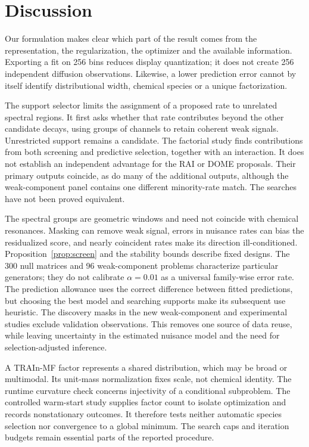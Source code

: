 \FloatBarrier
\section{Discussion}
Our formulation makes clear which part of the result comes from the representation,
the regularization, the optimizer and the available information. Exporting a fit
on 256 bins reduces display quantization; it does not create 256 independent
diffusion observations. Likewise, a lower prediction error cannot by itself
identify distributional width, chemical species or a unique factorization.

The support selector limits the assignment of a proposed rate to unrelated
spectral regions. It first asks whether that rate contributes beyond the other
candidate decays, using groups of channels to retain coherent weak signals.
Unrestricted support remains a candidate. The factorial study finds contributions
from both screening and predictive selection, together with an interaction.
It does not establish an independent advantage for the RAI or DOME proposals.
Their primary outputs coincide, as do many of the additional outputs, although
the weak-component panel contains one different minority-rate match. The searches
have not been proved equivalent.

The spectral groups are geometric windows and need not coincide with chemical
resonances. Masking can remove weak signal, errors in nuisance rates can bias the
residualized score, and nearly coincident rates make its direction ill-conditioned.
Proposition~\ref{prop:screen} and the stability bounds describe fixed designs.
The 300 null matrices and 96 weak-component problems characterize particular
generators; they do not calibrate $\alpha=0.01$ as a universal family-wise error
rate. The prediction allowance uses the correct difference between fitted
predictions, but choosing the best model and searching supports make its subsequent
use heuristic. The discovery masks in the new weak-component and experimental
studies exclude validation observations. This removes one source of data reuse,
while leaving uncertainty in the estimated nuisance model and the need for
selection-adjusted inference.

A TRAIn-MF factor represents a shared distribution, which may be broad or
multimodal. Its unit-mass normalization fixes scale, not chemical identity.
The runtime curvature check concerns injectivity of a conditional subproblem.
The controlled warm-start study supplies factor count to isolate optimization
and records nonstationary outcomes. It therefore tests neither automatic species
selection nor convergence to a global minimum. The search caps and iteration
budgets remain essential parts of the reported procedure.

